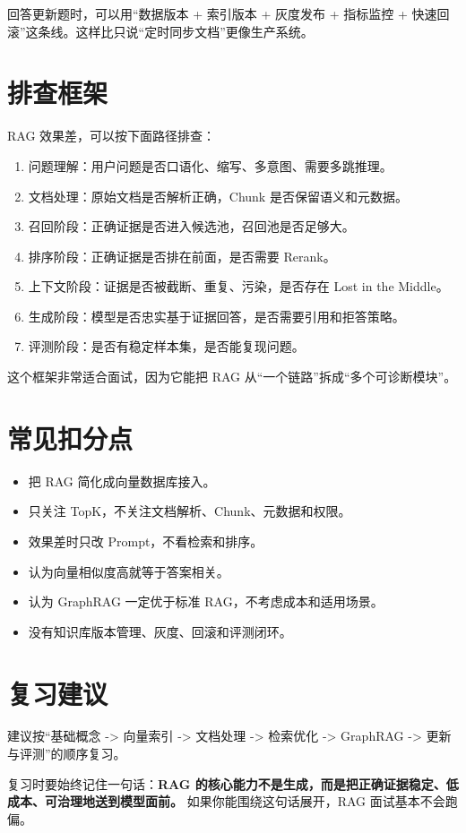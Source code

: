 \documentclass[10pt,a4paper]{ctexart}
\begin{document}
回答更新题时，可以用“数据版本 + 索引版本 + 灰度发布 + 指标监控 + 快速回滚”这条线。这样比只说“定时同步文档”更像生产系统。



\section{排查框架}


RAG 效果差，可以按下面路径排查：


\begin{enumerate}[itemsep=2pt, topsep=4pt]
  \item 问题理解：用户问题是否口语化、缩写、多意图、需要多跳推理。
  \item 文档处理：原始文档是否解析正确，Chunk 是否保留语义和元数据。
  \item 召回阶段：正确证据是否进入候选池，召回池是否足够大。
  \item 排序阶段：正确证据是否排在前面，是否需要 Rerank。
  \item 上下文阶段：证据是否被截断、重复、污染，是否存在 Lost in the Middle。
  \item 生成阶段：模型是否忠实基于证据回答，是否需要引用和拒答策略。
  \item 评测阶段：是否有稳定样本集，是否能复现问题。
\end{enumerate}


这个框架非常适合面试，因为它能把 RAG 从“一个链路”拆成“多个可诊断模块”。



\section{常见扣分点}

\begin{itemize}[itemsep=2pt, topsep=4pt]
  \item 把 RAG 简化成向量数据库接入。
  \item 只关注 TopK，不关注文档解析、Chunk、元数据和权限。
  \item 效果差时只改 Prompt，不看检索和排序。
  \item 认为向量相似度高就等于答案相关。
  \item 认为 GraphRAG 一定优于标准 RAG，不考虑成本和适用场景。
  \item 没有知识库版本管理、灰度、回滚和评测闭环。
\end{itemize}


\section{复习建议}


建议按“基础概念 -> 向量索引 -> 文档处理 -> 检索优化 -> GraphRAG -> 更新与评测”的顺序复习。



复习时要始终记住一句话：\textbf{RAG 的核心能力不是生成，而是把正确证据稳定、低成本、可治理地送到模型面前。} 如果你能围绕这句话展开，RAG 面试基本不会跑偏。
\end{document}
